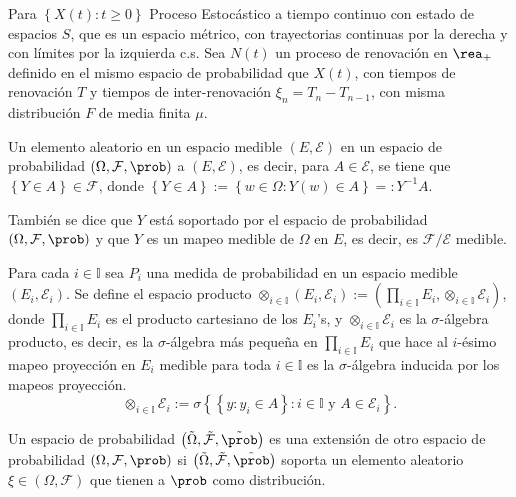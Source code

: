 Para $\left\{X\left(t\right):t\geq0\right\}$ Proceso Estoc\'astico a tiempo continuo con estado de espacios $S$, que es un espacio m\'etrico, con trayectorias continuas por la derecha y con l\'imites por la izquierda c.s. Sea $N\left(t\right)$ un proceso de renovaci\'on en $\rea_{+}$ definido en el mismo espacio de probabilidad que $X\left(t\right)$, con tiempos de renovaci\'on $T$ y tiempos de inter-renovaci\'on $\xi_{n}=T_{n}-T_{n-1}$, con misma distribuci\'on $F$ de media finita $\mu$.

\begin{Def}
Un elemento aleatorio en un espacio medible $\left(E,\mathcal{E}\right)$ en un espacio de probabilidad $\left(\Omega,\mathcal{F},\prob\right)$ a $\left(E,\mathcal{E}\right)$, es decir,
para $A\in \mathcal{E}$,  se tiene que $\left\{Y\in A\right\}\in\mathcal{F}$, donde $\left\{Y\in A\right\}:=\left\{w\in\Omega:Y\left(w\right)\in A\right\}=:Y^{-1}A$.
\end{Def}

\begin{Note}
Tambi\'en se dice que $Y$ est\'a soportado por el espacio de probabilidad $\left(\Omega,\mathcal{F},\prob\right)$ y que $Y$ es un mapeo medible de $\Omega$ en $E$, es decir, es $\mathcal{F}/\mathcal{E}$ medible.
\end{Note}

\begin{Def}
Para cada $i\in \mathbb{I}$ sea $P_{i}$ una medida de probabilidad en un espacio medible $\left(E_{i},\mathcal{E}_{i}\right)$. Se define el espacio producto
$\otimes_{i\in\mathbb{I}}\left(E_{i},\mathcal{E}_{i}\right):=\left(\prod_{i\in\mathbb{I}}E_{i},\otimes_{i\in\mathbb{I}}\mathcal{E}_{i}\right)$, donde $\prod_{i\in\mathbb{I}}E_{i}$ es el producto cartesiano de los $E_{i}$'s, y $\otimes_{i\in\mathbb{I}}\mathcal{E}_{i}$ es la $\sigma$-\'algebra producto, es decir, es la $\sigma$-\'algebra m\'as peque\~na en $\prod_{i\in\mathbb{I}}E_{i}$ que hace al $i$-\'esimo mapeo proyecci\'on en $E_{i}$ medible para toda $i\in\mathbb{I}$ es la $\sigma$-\'algebra inducida por los mapeos proyecci\'on. $$\otimes_{i\in\mathbb{I}}\mathcal{E}_{i}:=\sigma\left\{\left\{y:y_{i}\in A\right\}:i\in\mathbb{I}\textrm{ y }A\in\mathcal{E}_{i}\right\}.$$
\end{Def}

\begin{Def}
Un espacio de probabilidad $\left(\tilde{\Omega},\tilde{\mathcal{F}},\tilde{\prob}\right)$ es una extensi\'on de otro espacio de probabilidad $\left(\Omega,\mathcal{F},\prob\right)$ si $\left(\tilde{\Omega},\tilde{\mathcal{F}},\tilde{\prob}\right)$ soporta un elemento aleatorio $\xi\in\left(\Omega,\mathcal{F}\right)$ que tienen a $\prob$ como distribuci\'on.
\end{Def}

